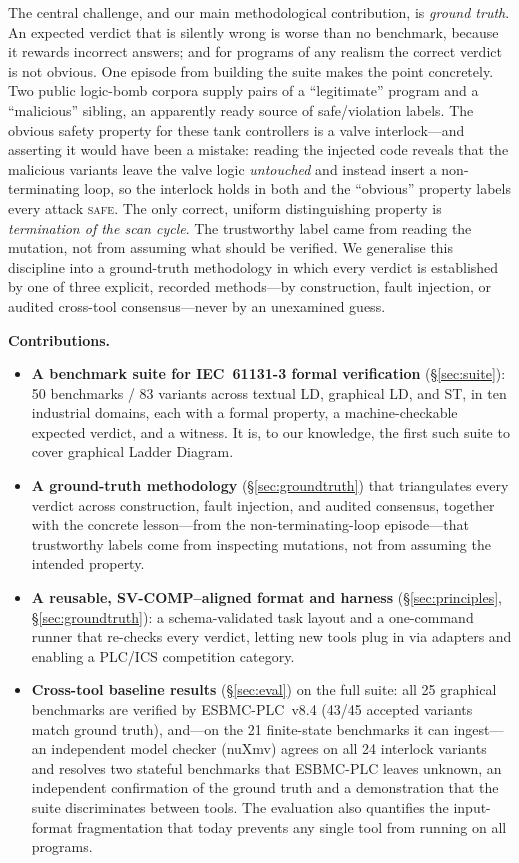 The central challenge, and our main methodological contribution, is \emph{ground truth}. An
expected verdict that is silently wrong is worse than no benchmark, because it rewards
incorrect answers; and for programs of any realism the correct verdict is not obvious. One
episode from building the suite makes the point concretely. Two public logic-bomb corpora
supply pairs of a ``legitimate'' program and a ``malicious'' sibling, an apparently ready
source of safe/violation labels. The obvious safety property for these tank controllers is a
valve interlock---and asserting it would have been a mistake: reading the injected code
reveals that the malicious variants leave the valve logic \emph{untouched} and instead insert
a non-terminating loop, so the interlock holds in both and the ``obvious'' property labels
every attack \textsc{safe}. The only correct, uniform distinguishing property is
\emph{termination of the scan cycle}. The trustworthy label came from reading the mutation,
not from assuming what should be verified. We generalise this discipline into a ground-truth
methodology in which every verdict is established by one of three explicit, recorded
methods---by construction, fault injection, or audited cross-tool consensus---never by an
unexamined guess.

\medskip\noindent\textbf{Contributions.}
\begin{itemize}
  \item \textbf{A benchmark suite for IEC~61131-3 formal verification} (\S\ref{sec:suite}):
    50 benchmarks / 83 variants across textual LD, graphical LD, and ST, in ten industrial
    domains, each with a formal property, a machine-checkable expected verdict, and a witness.
    It is, to our knowledge, the first such suite to cover graphical Ladder Diagram.
  \item \textbf{A ground-truth methodology} (\S\ref{sec:groundtruth}) that triangulates every
    verdict across construction, fault injection, and audited consensus, together with the
    concrete lesson---from the non-terminating-loop episode---that trustworthy labels come
    from inspecting mutations, not from assuming the intended property.
  \item \textbf{A reusable, SV-COMP--aligned format and harness} (\S\ref{sec:principles},
    \S\ref{sec:groundtruth}): a schema-validated task layout and a one-command runner that
    re-checks every verdict, letting new tools plug in via adapters and enabling a PLC/ICS
    competition category.
  \item \textbf{Cross-tool baseline results} (\S\ref{sec:eval}) on the full suite: all 25
    graphical benchmarks are verified by ESBMC-PLC~v8.4 (43/45 accepted variants match ground
    truth), and---on the 21 finite-state benchmarks it can ingest---an independent model checker
    (nuXmv) agrees on all 24 interlock variants and resolves two stateful benchmarks that ESBMC-PLC
    leaves unknown, an independent confirmation of the ground truth and a demonstration that the
    suite discriminates between tools. The evaluation also quantifies
    the input-format fragmentation that today prevents any single tool from running on all
    programs.
\end{itemize}

